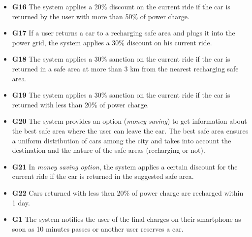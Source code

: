 \begin{itemize}
				\item \textbf{G16} The system applies a 20\% discount on the current ride if the car is returned by the user with more than 50\% of power charge.
				\item \textbf{G17} If a user returns a car to a recharging safe area and plugs it into the power grid, the system applies a 30\% discount on his current ride. %
				\item \textbf{G18} The system applies a 30\% sanction on the current ride if the car is returned in a safe area at more than 3 km from the nearest recharging safe area.
				\item \textbf{G19} The system applies a 30\% sanction on the current ride if the car is returned with less than 20\% of power charge.
				\item \textbf{G20} The system provides an option (\textit{money saving}) to get information about the best safe area where the user can leave the car. The best safe area ensures a uniform distribution of cars among the city and takes into account the destination and the nature of the safe areas (recharging or not). %
				\item \textbf{G21} In \textit{money saving option}, the system applies a certain discount for the current ride if the car is returned in the suggested safe area. %
				\item \textbf{G22} Cars returned with less then 20\% of power charge are recharged within 1 day. %
				
				
				\item \textbf{G1} The system notifies the user of the final charges on their smartphone as soon as 10 minutes passes or another user reserves a car. %
			\end{itemize}
